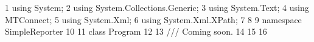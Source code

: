  1	using System;
 2	using System.Collections.Generic;
 3	using System.Text;
 4	using MTConnect;
 5	using System.Xml;
 6	using System.Xml.XPath;
 7	
 8	
 9	namespace SimpleReporter
10	{
11	    class Program
12	    {
13          ///  Coming soon.
14	    }
15	}
16	
